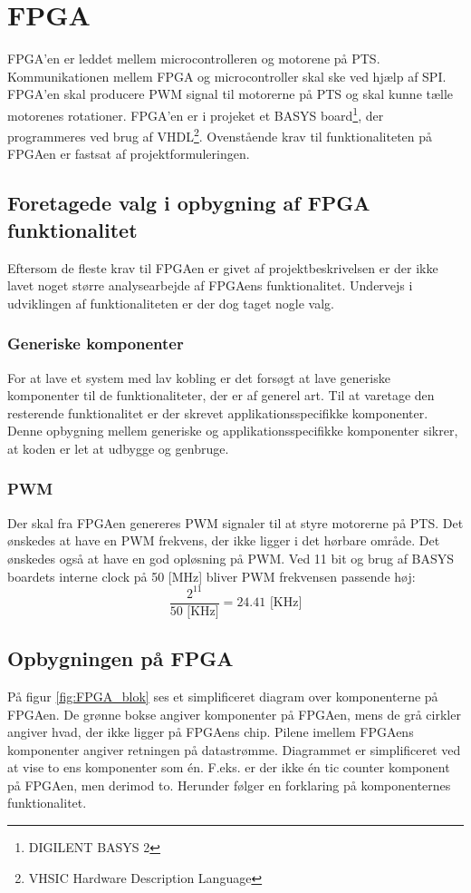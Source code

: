 \section{FPGA}
\label{sec:FPGA}
FPGA'en er leddet mellem microcontrolleren og motorene på PTS. 
Kommunikationen mellem FPGA og microcontroller skal ske ved hjælp af SPI. 
FPGA'en skal producere PWM signal til motorerne på PTS og skal kunne tælle motorenes rotationer. 
FPGA'en er i projeket et BASYS board\footnote{DIGILENT BASYS 2}, der programmeres ved brug af VHDL\footnote{VHSIC Hardware Description Language}.
Ovenstående krav til funktionaliteten på FPGAen er fastsat af 
projektformuleringen.


\subsection{Foretagede valg i opbygning af FPGA funktionalitet}
Eftersom de fleste krav til FPGAen er givet af projektbeskrivelsen er der ikke 
lavet noget større analysearbejde af FPGAens funktionalitet. Undervejs i 
udviklingen af funktionaliteten er der dog taget nogle valg.

\subsubsection*{Generiske komponenter}
For at lave et system med lav kobling er det forsøgt at lave 
generiske komponenter til de funktionaliteter, der er af generel art. 
Til at varetage den resterende funktionalitet er der skrevet applikationsspecifikke 
komponenter.
Denne opbygning mellem generiske og applikationsspecifikke komponenter sikrer, at koden er let at 
udbygge og genbruge.

\subsubsection*{PWM}
Der skal fra FPGAen genereres PWM signaler til at styre motorerne på PTS.
Det ønskedes at have en PWM frekvens, der ikke ligger i det hørbare område. 
Det ønskedes også at have en god opløsning på PWM. 
Ved 11 bit og brug af BASYS boardets interne clock på 50 [MHz] bliver PWM frekvensen passende høj:
\begin{equation}
  \frac{2^{11}}{50  \text{ [KHz]}} = 24.41 \text{ [KHz]} 
\end{equation}

\subsection{Opbygningen på FPGA}
På figur \ref{fig:FPGA_blok} ses et simplificeret diagram over komponenterne på FPGAen. 
De grønne bokse angiver komponenter på FPGAen, mens de grå cirkler angiver hvad, der ikke ligger på 
FPGAens chip. Pilene imellem FPGAens komponenter angiver retningen på 
datastrømme. Diagrammet er simplificeret ved at vise to ens komponenter som én. 
F.eks. er der ikke én tic counter komponent på FPGAen, men derimod to.
Herunder følger en forklaring på komponenternes funktionalitet.

